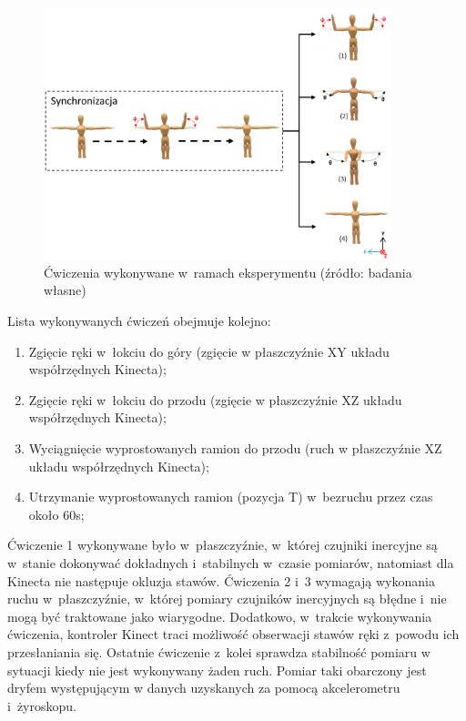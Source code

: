 \begin{figure}[!htb]
	\centering
	\includegraphics[width=0.9\textwidth]{images/poses.png}
	\caption{Ćwiczenia wykonywane w~ramach eksperymentu  (źródło: badania własne)}
	\label{fig:experiments:poses}
\end{figure}
\newpage				
Lista wykonywanych ćwiczeń obejmuje kolejno:

\begin{enumerate}
	\item Zgięcie ręki w~łokciu do góry (zgięcie w płaszczyźnie XY układu współrzędnych Kinecta); \\
	\item Zgięcie ręki w~łokciu do przodu (zgięcie w płaszczyźnie XZ układu współrzędnych Kinecta); \\
	\item Wyciągnięcie wyprostowanych ramion do przodu (ruch w płaszczyźnie XZ układu współrzędnych Kinecta); \\
	\item Utrzymanie wyprostowanych ramion (pozycja T) w~bezruchu przez czas około 60s; \\
\end{enumerate}
						
Ćwiczenie 1 wykonywane było w~płaszczyźnie, w~której czujniki inercyjne są w~stanie dokonywać dokładnych i~stabilnych w~czasie pomiarów, natomiast dla Kinecta nie następuje okluzja stawów. Ćwiczenia 2 i~3 wymagają wykonania ruchu w~płaszczyźnie, w~której pomiary czujników inercyjnych są błędne i~nie mogą być traktowane jako wiarygodne. Dodatkowo, w~trakcie wykonywania ćwiczenia, kontroler Kinect traci możliwość obserwacji stawów ręki z~powodu ich przesłaniania się. Ostatnie ćwiczenie z~kolei sprawdza stabilność pomiaru w sytuacji kiedy nie jest wykonywany żaden ruch. Pomiar taki obarczony jest dryfem występującym w danych uzyskanych za pomocą akcelerometru i~żyroskopu.
						
